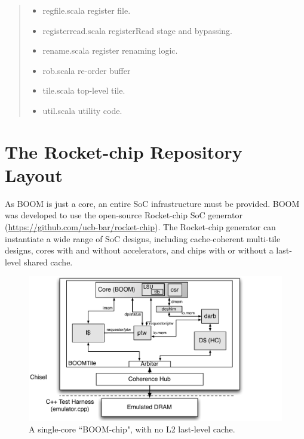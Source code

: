 \begin{quote}
\begin{itemize}
\begin{itemize}
  \item regfile.scala {\footnotesize \color{red} register file.}
  \item registerread.scala {\footnotesize \color{red} registerRead stage and bypassing.}
  \item rename.scala {\footnotesize \color{red} register renaming logic.}
  \item rob.scala {\footnotesize \color{red} re-order buffer}
  \item tile.scala {\footnotesize \color{red} top-level tile.}
  \item util.scala {\footnotesize \color{red} utility code.}


\end{itemize}
\end{itemize}
\end{quote}




\section{The Rocket-chip Repository Layout}

As BOOM is just a core, an entire SoC infrastructure must be provided.  BOOM was developed to use the open-source Rocket-chip SoC generator (\url{https://github.com/ucb-bar/rocket-chip}). The Rocket-chip generator can instantiate a wide range of SoC designs, including cache-coherent multi-tile designs, cores with and without accelerators, and chips with or without a last-level shared cache. 




\begin{figure}[ht]
	\centering
	\centerline{\includegraphics[scale =.9] {figures/chip}}
	\caption{ \small A single-core ``BOOM-chip", with no L2 last-level cache.}
	\label{fig:boomchip}
\end{figure}




